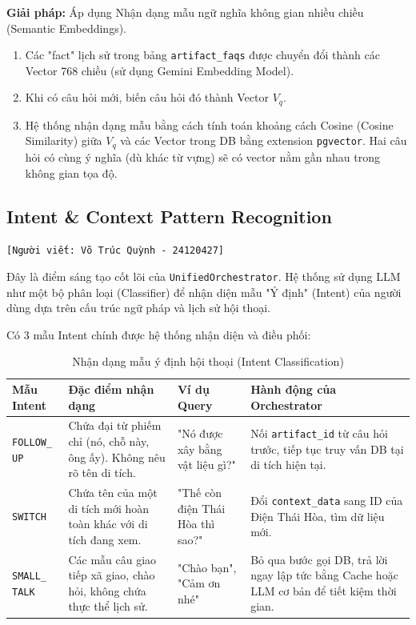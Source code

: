 \textbf{Giải pháp:} Áp dụng Nhận dạng mẫu ngữ nghĩa không gian nhiều chiều (Semantic Embeddings).
\begin{enumerate}
    \item Các "fact" lịch sử trong bảng \texttt{artifact\_faqs} được chuyển đổi thành các Vector 768 chiều (sử dụng Gemini Embedding Model).
    \item Khi có câu hỏi mới, biến câu hỏi đó thành Vector $V_q$.
    \item Hệ thống nhận dạng mẫu bằng cách tính toán khoảng cách Cosine (Cosine Similarity) giữa $V_q$ và các Vector trong DB bằng extension \texttt{pgvector}. Hai câu hỏi có cùng ý nghĩa (dù khác từ vựng) sẽ có vector nằm gần nhau trong không gian tọa độ.
\end{enumerate}

\subsection{Intent \& Context Pattern Recognition}
\texttt{[Người viết: Võ Trúc Quỳnh - 24120427]}

Đây là điểm sáng tạo cốt lõi của \texttt{UnifiedOrchestrator}. Hệ thống sử dụng LLM như một bộ phân loại (Classifier) để nhận diện mẫu "Ý định" (Intent) của người dùng dựa trên cấu trúc ngữ pháp và lịch sử hội thoại.

Có 3 mẫu Intent chính được hệ thống nhận diện và điều phối:
\begin{table}[H]
    \centering
    \renewcommand{\arraystretch}{1.3}
    \begin{tabular}{|p{1.5cm}|p{4.5cm}|p{3cm}|p{5.5cm}|}
        \hline
        \textbf{Mẫu Intent} & \textbf{Đặc điểm nhận dạng} & \textbf{Ví dụ Query} & \textbf{Hành động của Orchestrator} \\ \hline
        \texttt{FOLLOW\_ UP} & Chứa đại từ phiếm chỉ (nó, chỗ này, ông ấy). Không nêu rõ tên di tích. & "Nó được xây bằng vật liệu gì?" & Nối \texttt{artifact\_id} từ câu hỏi trước, tiếp tục truy vấn DB tại di tích hiện tại. \\ \hline
        \texttt{SWITCH} & Chứa tên của một di tích mới hoàn toàn khác với di tích đang xem. & "Thế còn điện Thái Hòa thì sao?" & Đổi \texttt{context\_data} sang ID của Điện Thái Hòa, tìm dữ liệu mới. \\ \hline
        \texttt{SMALL\_ TALK} & Các mẫu câu giao tiếp xã giao, chào hỏi, không chứa thực thể lịch sử. & "Chào bạn", "Cảm ơn nhé" & Bỏ qua bước gọi DB, trả lời ngay lập tức bằng Cache hoặc LLM cơ bản để tiết kiệm thời gian. \\ \hline
    \end{tabular}
    \caption{Nhận dạng mẫu ý định hội thoại (Intent Classification)}
\end{table}

